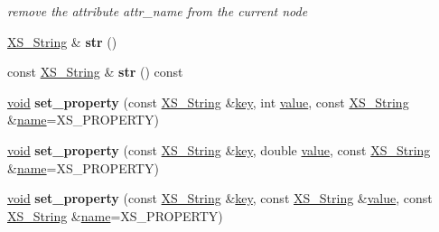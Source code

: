 \begin{DoxyCompactItemize}
\begin{DoxyCompactList}\small\item\em remove the attribute \textquotesingle{}attr\+\_\+name\textquotesingle{} from the current node \end{DoxyCompactList}\item 
\mbox{\label{struct_x_m_l_storage_1_1_x_m_l_pos_a45cf77b98e31fd1a341bfc3dbbba940a}} 
\hyperlink{struct_x_m_l_storage_1_1_x_s___string}{X\+S\+\_\+\+String} \& {\bfseries str} ()
\item 
\mbox{\label{struct_x_m_l_storage_1_1_x_m_l_pos_aeb70c5413dd243ebc418deb7061b4554}} 
const \hyperlink{struct_x_m_l_storage_1_1_x_s___string}{X\+S\+\_\+\+String} \& {\bfseries str} () const
\item 
\mbox{\label{struct_x_m_l_storage_1_1_x_m_l_pos_ab69b02189e106ecbbe9121d3cdea6ed3}} 
\hyperlink{interfacevoid}{void} {\bfseries set\+\_\+property} (const \hyperlink{struct_x_m_l_storage_1_1_x_s___string}{X\+S\+\_\+\+String} \&\hyperlink{structkey}{key}, int \hyperlink{unionvalue}{value}, const \hyperlink{struct_x_m_l_storage_1_1_x_s___string}{X\+S\+\_\+\+String} \&\hyperlink{structname}{name}=X\+S\+\_\+\+P\+R\+O\+P\+E\+R\+TY)
\item 
\mbox{\label{struct_x_m_l_storage_1_1_x_m_l_pos_a3adafbb5731265fb4f789f6f2415f2f5}} 
\hyperlink{interfacevoid}{void} {\bfseries set\+\_\+property} (const \hyperlink{struct_x_m_l_storage_1_1_x_s___string}{X\+S\+\_\+\+String} \&\hyperlink{structkey}{key}, double \hyperlink{unionvalue}{value}, const \hyperlink{struct_x_m_l_storage_1_1_x_s___string}{X\+S\+\_\+\+String} \&\hyperlink{structname}{name}=X\+S\+\_\+\+P\+R\+O\+P\+E\+R\+TY)
\item 
\mbox{\label{struct_x_m_l_storage_1_1_x_m_l_pos_a46167cf9ef2edd28ada566df4dc0cca3}} 
\hyperlink{interfacevoid}{void} {\bfseries set\+\_\+property} (const \hyperlink{struct_x_m_l_storage_1_1_x_s___string}{X\+S\+\_\+\+String} \&\hyperlink{structkey}{key}, const \hyperlink{struct_x_m_l_storage_1_1_x_s___string}{X\+S\+\_\+\+String} \&\hyperlink{unionvalue}{value}, const \hyperlink{struct_x_m_l_storage_1_1_x_s___string}{X\+S\+\_\+\+String} \&\hyperlink{structname}{name}=X\+S\+\_\+\+P\+R\+O\+P\+E\+R\+TY)

\end{DoxyCompactItemize}

